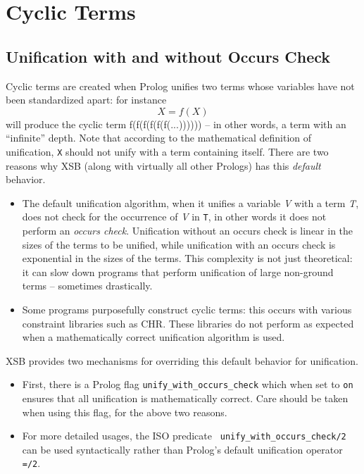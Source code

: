 \section{Cyclic Terms}\label{sec:cyclic}
\subsection{Unification with and without Occurs Check}
%

    Cyclic terms are created when Prolog unifies two terms whose
    variables have not been standardized apart: for instance
\[
    X = f(X)
\]
    will produce the cyclic term f(f(f(f(f(f(...)))))) -- in other
    words, a term with an ``infinite'' depth.  Note that according to
    the mathematical definition of unification, {\tt X} should not
    unify with a term containing itself.  There are two reasons why
    XSB (along with virtually all other Prologs) has this {\em
      default} behavior.

\begin{itemize}
%
\item The default unification algorithm, when it unifies a variable
  {\em V} with a term {\em T}, does not check for the occurrence of
  {\em V} in {\tt T}, in other words it does not perform an {\em
    occurs check}.  Unification without an occurs check is linear in
  the sizes of the terms to be unified, while unification with an
  occurs check is exponential in the sizes of the terms.  This
  complexity is not just theoretical: it can slow down programs that
  perform unification of large non-ground terms -- sometimes
  drastically.
%
\item Some programs purposefully construct cyclic terms: this occurs
  with various constraint libraries such as CHR.  These libraries do
  not perform as expected when a mathematically correct unification
  algorithm is used.
\end{itemize}

XSB provides two mechanisms for overriding this default behavior for
unification.

\begin{itemize}
\item First, there is a Prolog flag {\tt unify\_with\_occurs\_check}
  which when set to {\tt on} ensures that all unification is
  mathematically correct.  Care should be taken when using this flag,
  for the above two reasons.
%
\item For more detailed usages, the ISO predicate {\tt
  unify\_with\_occurs\_check/2} can be used syntactically rather than
  Prolog's default unification operator {\tt =/2}.
\end{itemize}

